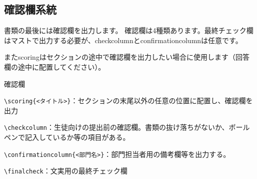 \begin{multicols*}{2}
\section{確認欄系統}
書類の最後には確認欄を出力します。
確認欄は4種類あります。最終チェック欄はマストで出力する必要が、checkcolumnとconfirmationcolumnは任意です。

またscoringはセクションの途中で確認欄を出力したい場合に使用します（回答欄の途中に配置してください）。
\begin{framebox-simple}{確認欄}
    \begin{reitemize}
        \item \verb|\scoring{<タイトル>}|：セクションの末尾以外の任意の位置に配置し、確認欄を出力
        \item \verb|\checkcolumn|：生徒向けの提出前の確認欄。書類の抜け落ちがないか、ボールペンで記入しているか等の項目がある。
        \item \verb|\confirmationcolumn{<部門名>}|：部門担当者用の備考欄等を出力する。
        \item \verb|\finalcheck|：文実用の最終チェック欄
    \end{reitemize}
\end{framebox-simple}
\end{multicols*}